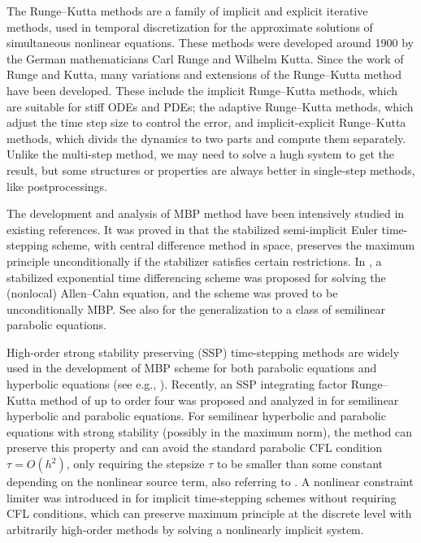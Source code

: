 The Runge--Kutta methods are a family of implicit and explicit 
iterative methods, used in temporal discretization for the approximate solutions of 
simultaneous nonlinear equations. 
These methods were developed around 1900 
by the German mathematicians Carl Runge and Wilhelm Kutta.
Since the work of Runge and Kutta, 
many variations and extensions of the Runge--Kutta method have been 
developed. 
These include the implicit Runge--Kutta methods, 
which are suitable for stiff ODEs and PDEs; 
the adaptive Runge--Kutta methods, which adjust the time step size 
to control the error, and implicit-explicit Runge--Kutta methods, 
which divids the dynamics to two parts and compute them separately. 
Unlike the multi-step method, we may need to solve a hugh system to get the result, 
but some structures or properties are always better in single-step methods, 
like postprocessings. 

The development and analysis of MBP method have been intensively studied in existing references.
It was proved in \cite{tangyang1,ShenTangYang:2016} that the stabilized semi-implicit Euler time-stepping scheme,
with central difference method in space, preserves the maximum principle unconditionally
if the stabilizer satisfies certain restrictions. In \cite{DuJuLiQiao:2019},
a stabilized exponential time differencing scheme was proposed for solving the (nonlocal) Allen--Cahn equation,
and the scheme was proved to be unconditionally MBP. See also \cite{DuJuLiQiao:2020}
for the generalization to a class of semilinear parabolic equations.

High-order strong stability preserving (SSP) time-stepping methods are widely used
in the development of MBP scheme for both parabolic equations and hyperbolic equations (see e.g.,  
\cite{gottlieb1998total,Liu-Yu-2014,GottliebShuTadmor:2001,gottlieb2011strong,Liu-Osher-1996,Qiu-Shu-2005,Xu-2014,Zhang-Shu-2010}).
Recently, an SSP integrating factor Runge--Kutta method of up to order four was proposed and
analyzed in \cite{IsherwoodGrantGottlieb:2018} for semilinear hyperbolic and parabolic equations.
For semilinear hyperbolic and parabolic equations with strong stability (possibly in the maximum norm), the method
can preserve this property and can avoid the standard parabolic CFL condition $\tau=O(h^2)$, only requiring
the stepsize $\tau$ to be smaller than some constant depending on the nonlinear source term, also referring to \cite{ju2020maximum}.
A nonlinear constraint limiter was introduced in \cite{Vegt-Xia-Xu-2019} for implicit time-stepping
schemes without requiring CFL conditions, which can preserve maximum principle at the
discrete level with arbitrarily high-order methods by solving a nonlinearly implicit system.

